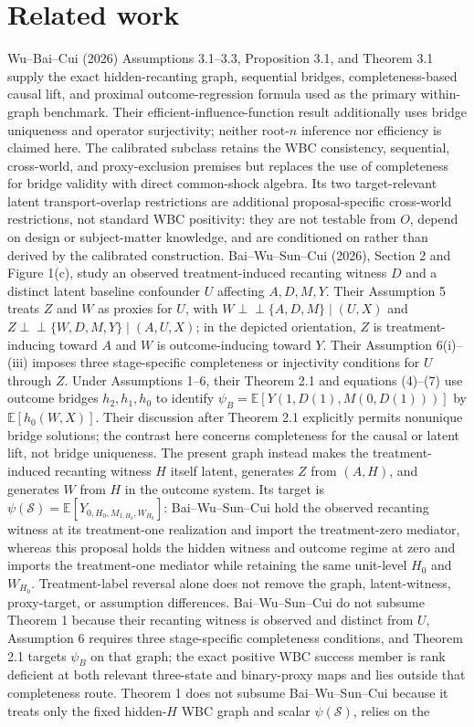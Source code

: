 \documentclass{article}
\begin{document}
\section{Related work}

Wu--Bai--Cui (2026) Assumptions 3.1--3.3, Proposition 3.1, and Theorem 3.1 supply the exact hidden-recanting graph, sequential bridges, completeness-based causal lift, and proximal outcome-regression formula used as the primary within-graph benchmark. Their efficient-influence-function result additionally uses bridge uniqueness and operator surjectivity; neither root-\(n\) inference nor efficiency is claimed here. The calibrated subclass retains the WBC consistency, sequential, cross-world, and proxy-exclusion premises but replaces the use of completeness for bridge validity with direct common-shock algebra. Its two target-relevant latent transport-overlap restrictions are additional proposal-specific cross-world restrictions, not standard WBC positivity: they are not testable from \(O\), depend on design or subject-matter knowledge, and are conditioned on rather than derived by the calibrated construction. Bai--Wu--Sun--Cui (2026), Section 2 and Figure 1(c), study an observed treatment-induced recanting witness \(D\) and a distinct latent baseline confounder \(U\) affecting \(A,D,M,Y\). Their Assumption 5 treats \(Z\) and \(W\) as proxies for \(U\), with \(W\mathbin{\perp\!\!\!\perp}\{A,D,M\}\mid(U,X)\) and \(Z\mathbin{\perp\!\!\!\perp}\{W,D,M,Y\}\mid(A,U,X)\); in the depicted orientation, \(Z\) is treatment-inducing toward \(A\) and \(W\) is outcome-inducing toward \(Y\). Their Assumption 6(i)--(iii) imposes three stage-specific completeness or injectivity conditions for \(U\) through \(Z\). Under Assumptions 1--6, their Theorem 2.1 and equations (4)--(7) use outcome bridges \(h_2,h_1,h_0\) to identify \(\psi_B=\mathbb E[Y(1,D(1),M(0,D(1)))]\) by \(\mathbb E[h_0(W,X)]\). Their discussion after Theorem 2.1 explicitly permits nonunique bridge solutions; the contrast here concerns completeness for the causal or latent lift, not bridge uniqueness. The present graph instead makes the treatment-induced recanting witness \(H\) itself latent, generates \(Z\) from \((A,H)\), and generates \(W\) from \(H\) in the outcome system. Its target is \(\psi(\mathcal S)=\mathbb E[Y_{0,H_0,M_{1,H_0},W_{H_0}}]\): Bai--Wu--Sun--Cui hold the observed recanting witness at its treatment-one realization and import the treatment-zero mediator, whereas this proposal holds the hidden witness and outcome regime at zero and imports the treatment-one mediator while retaining the same unit-level \(H_0\) and \(W_{H_0}\). Treatment-label reversal alone does not remove the graph, latent-witness, proxy-target, or assumption differences. Bai--Wu--Sun--Cui do not subsume Theorem 1 because their recanting witness is observed and distinct from \(U\), Assumption 6 requires three stage-specific completeness conditions, and Theorem 2.1 targets \(\psi_B\) on that graph; the exact positive WBC success member is rank deficient at both relevant three-state and binary-proxy maps and lies outside that completeness route. Theorem 1 does not subsume Bai--Wu--Sun--Cui because it treats only the fixed hidden-\(H\) WBC graph and scalar \(\psi(\mathcal S)\), relies on the 
\end{document}

